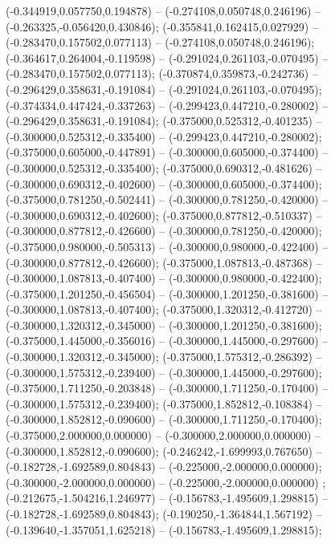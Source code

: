  (-0.344919,0.057750,0.194878) -- (-0.274108,0.050748,0.246196) -- (-0.263325,-0.056420,0.430846);
 (-0.355841,0.162415,0.027929) -- (-0.283470,0.157502,0.077113) -- (-0.274108,0.050748,0.246196);
 (-0.364617,0.264004,-0.119598) -- (-0.291024,0.261103,-0.070495) -- (-0.283470,0.157502,0.077113);
 (-0.370874,0.359873,-0.242736) -- (-0.296429,0.358631,-0.191084) -- (-0.291024,0.261103,-0.070495);
 (-0.374334,0.447424,-0.337263) -- (-0.299423,0.447210,-0.280002) -- (-0.296429,0.358631,-0.191084);
 (-0.375000,0.525312,-0.401235) -- (-0.300000,0.525312,-0.335400) -- (-0.299423,0.447210,-0.280002);
 (-0.375000,0.605000,-0.447891) -- (-0.300000,0.605000,-0.374400) -- (-0.300000,0.525312,-0.335400);
 (-0.375000,0.690312,-0.481626) -- (-0.300000,0.690312,-0.402600) -- (-0.300000,0.605000,-0.374400);
 (-0.375000,0.781250,-0.502441) -- (-0.300000,0.781250,-0.420000) -- (-0.300000,0.690312,-0.402600);
 (-0.375000,0.877812,-0.510337) -- (-0.300000,0.877812,-0.426600) -- (-0.300000,0.781250,-0.420000);
 (-0.375000,0.980000,-0.505313) -- (-0.300000,0.980000,-0.422400) -- (-0.300000,0.877812,-0.426600);
 (-0.375000,1.087813,-0.487368) -- (-0.300000,1.087813,-0.407400) -- (-0.300000,0.980000,-0.422400);
 (-0.375000,1.201250,-0.456504) -- (-0.300000,1.201250,-0.381600) -- (-0.300000,1.087813,-0.407400);
 (-0.375000,1.320312,-0.412720) -- (-0.300000,1.320312,-0.345000) -- (-0.300000,1.201250,-0.381600);
 (-0.375000,1.445000,-0.356016) -- (-0.300000,1.445000,-0.297600) -- (-0.300000,1.320312,-0.345000);
 (-0.375000,1.575312,-0.286392) -- (-0.300000,1.575312,-0.239400) -- (-0.300000,1.445000,-0.297600);
 (-0.375000,1.711250,-0.203848) -- (-0.300000,1.711250,-0.170400) -- (-0.300000,1.575312,-0.239400);
 (-0.375000,1.852812,-0.108384) -- (-0.300000,1.852812,-0.090600) -- (-0.300000,1.711250,-0.170400);
 (-0.375000,2.000000,0.000000) -- (-0.300000,2.000000,0.000000) -- (-0.300000,1.852812,-0.090600);
 (-0.246242,-1.699993,0.767650) -- (-0.182728,-1.692589,0.804843) -- (-0.225000,-2.000000,0.000000);
 (-0.300000,-2.000000,0.000000) -- (-0.225000,-2.000000,0.000000) ;
 (-0.212675,-1.504216,1.246977) -- (-0.156783,-1.495609,1.298815) -- (-0.182728,-1.692589,0.804843);
 (-0.190250,-1.364844,1.567192) -- (-0.139640,-1.357051,1.625218) -- (-0.156783,-1.495609,1.298815);
